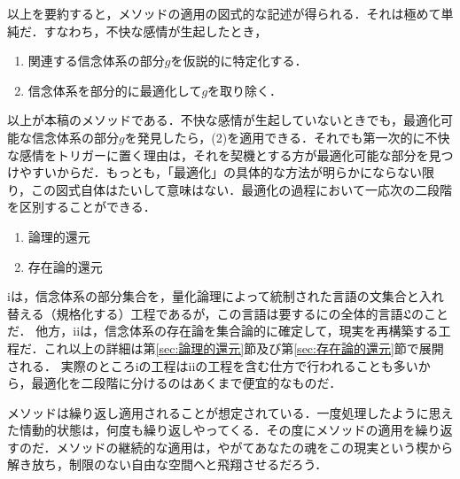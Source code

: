 以上を要約すると，メソッドの適用の図式的な記述が得られる．それは極めて単純だ．すなわち，不快な感情が生起したとき，
\begin{enumerate}[label=(\arabic*)]
    \item 関連する信念体系の部分$g$を仮説的に特定化する．
    \item 信念体系を部分的に最適化して$g$を取り除く．
\end{enumerate}
以上が本稿のメソッドである．不快な感情が生起していないときでも，最適化可能な信念体系の部分$g$を発見したら，(2)を適用できる．それでも第一次的に不快な感情をトリガーに置く理由は，それを契機とする方が最適化可能な部分を見つけやすいからだ．もっとも，「最適化」の具体的な方法が明らかにならない限り，この図式自体はたいして意味はない．最適化の過程において一応次の二段階を区別することができる．
\begin{enumerate}[label=\roman*.]
    \item 論理的還元
    \item 存在論的還元
\end{enumerate}
iは，信念体系の部分集合を，量化論理によって統制された言語の文集合と入れ替える（規格化する）工程であるが，この言語は要するにの全体的言語$\mathfrak{L}$のことだ．
他方，iiは，信念体系の存在論を集合論的に確定して，現実を再構築する工程だ．これ以上の詳細は第\ref{sec:論理的還元}節及び第\ref{sec:存在論的還元}節で展開される．
実際のところiの工程はiiの工程を含む仕方で行われることも多いから，最適化を二段階に分けるのはあくまで便宜的なものだ．

メソッドは繰り返し適用されることが想定されている．一度処理したように思えた情動的状態は，何度も繰り返しやってくる．その度にメソッドの適用を繰り返すのだ．メソッドの継続的な適用は，やがてあなたの魂をこの現実という楔から解き放ち，制限のない自由な空間へと飛翔させるだろう．
